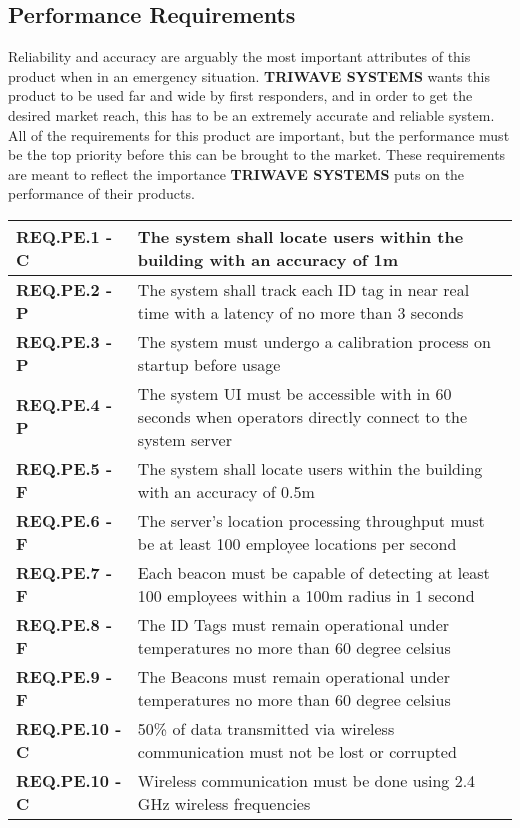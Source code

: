 \documentclass[11pt]{article}
\begin{document}
\subsection{Performance Requirements}
Reliability and accuracy are arguably the most important attributes of this product when in an emergency situation. \textbf{TRIWAVE SYSTEMS} wants this product to be used far and wide by first responders, and in order to get the desired market reach, this has to be an extremely accurate and reliable system. All of the requirements for this product are important, but the performance must be the top priority before this can be brought to the market. These requirements are meant to reflect the importance \textbf{TRIWAVE SYSTEMS} puts on the performance of their products.
\bgroup
\def\arraystretch{1.5}
\begin{table}[H]
\centering
\begin{tabular}{ | m{3.5cm} | m{12.5cm} | } 
 \hline
 \textbf{ REQ.PE.1 - C } & The system shall locate users within the building with an accuracy of 1m \\ 
\hline
 \textbf{ REQ.PE.2 - P} & The system shall track each ID tag in near real time with a latency of no more than 3 seconds \\ 
\hline
 \textbf{ REQ.PE.3 - P } & The system must undergo a calibration process on startup before usage \\ 
\hline
 \textbf{ REQ.PE.4 - P} & The system UI must be accessible with in 60 seconds when operators directly connect to the system server \\
\hline
 \textbf{ REQ.PE.5 - F} & The system shall locate users within the building with an accuracy of 0.5m \\
\hline
 \textbf{ REQ.PE.6 - F } & The server's location processing throughput must be at least 100 employee locations per second \\
\hline
 \textbf{ REQ.PE.7 - F } & Each beacon must be capable of detecting at least 100 employees within a 100m radius in 1 second \\
\hline
 \textbf{ REQ.PE.8 - F } & The ID Tags must remain operational under temperatures no more than 60 degree celsius \\
\hline
 \textbf{ REQ.PE.9 - F } & The Beacons must remain operational under temperatures no more than 60 degree celsius \\
\hline
 \textbf{ REQ.PE.10 - C } & 50\% of data transmitted via wireless communication must not be lost or corrupted \\
\hline
 \textbf{ REQ.PE.10 - C } & Wireless communication must be done using 2.4 GHz wireless frequencies \\

\end{tabular}
\end{table}
\end{document}
